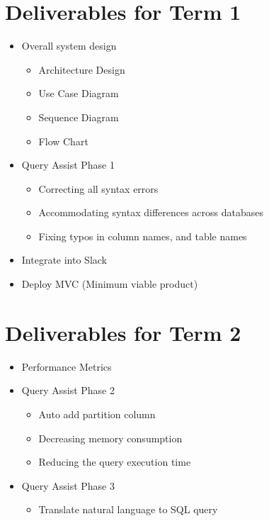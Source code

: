 \section{Deliverables for Term 1}
\begin{itemize}
    \item  Overall system design
    \begin{itemize}
        \item Architecture Design
        \item Use Case Diagram
        \item Sequence Diagram
        \item Flow Chart
    \end{itemize}

    \item  Query Assist Phase 1
    \begin{itemize}
        \item Correcting all syntax errors
        \item Accommodating syntax differences across databases
        \item Fixing typos in column names, and table names
    \end{itemize}

    \item  Integrate into Slack
    \item Deploy MVC (Minimum viable product)
\end{itemize}
\section{Deliverables for Term 2}
\begin{itemize}
    \item  Performance Metrics

    \item  Query Assist Phase 2
    \begin{itemize}
        \item Auto add partition column
        \item Decreasing memory consumption
        \item Reducing the query execution time
    \end{itemize}
    \item Query Assist Phase 3
    \begin{itemize}
        \item Translate natural language to SQL query
    \end{itemize}
\end{itemize}
\pagebreak